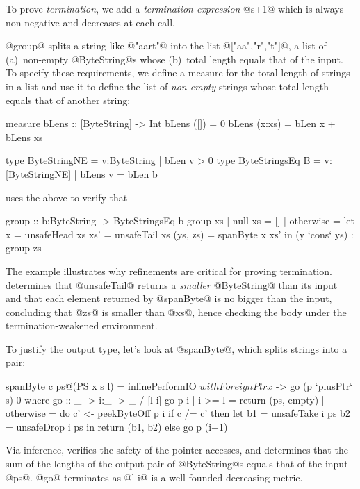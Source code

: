 To prove \emph{termination}, we add a \emph{termination expression} 
@s+1@ which is always non-negative and decreases at each call.

@group@ splits a string like @"aart"@ into the list
@["aa","r","t"]@, \ie a list of
(a)~non-empty @ByteString@s whose 
(b)~total length equals that of the input. 
To specify these requirements, we define a measure for 
the total length of strings in a list and use it to
define the list of \emph{non-empty} strings
whose total length equals that of another string:

\begin{code}
  measure bLens :: [ByteString] -> Int 
    bLens ([])     = 0
    bLens (x:xs)   = bLen x + bLens xs
  
  type ByteStringNE    = {v:ByteString | bLen v > 0}
  type ByteStringsEq B = {v:[ByteStringNE] | bLens v = bLen b}
\end{code}
%
\toolname uses the above to verify that
%
\begin{code}
  group :: b:ByteString -> ByteStringsEq b
  group xs
   | null xs   = []
   | otherwise = let x        = unsafeHead xs
                     xs'      = unsafeTail xs
                     (ys, zs) = spanByte x xs' 
                 in (y `cons` ys) : group zs
\end{code}
%
The example illustrates why refinements are critical for
proving termination. \toolname determines that @unsafeTail@ 
returns a \emph{smaller} @ByteString@ than its input and that
each element returned by @spanByte@ is no bigger than the 
input, concluding that @zs@ is smaller than @xs@, hence
checking the body under the termination-weakened environment.

To justify the output type, let's look at @spanByte@,
which splits strings into a pair:
%
\begin{code}
  spanByte c ps@(PS x s l) 
    = inlinePerformIO $ withForeignPtr x $
          \p -> go (p `plusPtr` s) 0
    where
      go :: _ -> i:_ -> _ / [l-i]
      go p i 
        | i >= l    = return (ps, empty)
        | otherwise = do
            c' <- peekByteOff p i
            if c /= c'
              then let b1 = unsafeTake i ps
                       b2 = unsafeDrop i ps
                   in  return (b1, b2)
              else go p (i+1)
\end{code}
%
Via inference, \toolname verifies the safety of 
the pointer accesses, and determines that the 
sum of the lengths of the output pair of 
@ByteString@s equals that of the input @ps@.
@go@ terminates as @l-i@ is a well-founded 
decreasing metric.

